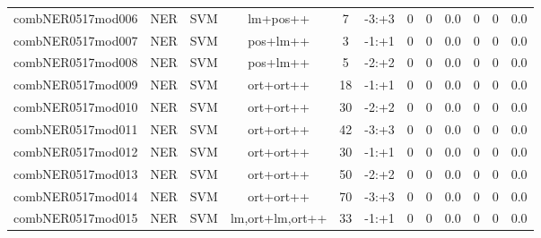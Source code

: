 \documentclass[a4paper]{article}
\begin{document}
\begin{landscape}
\begin{center}
\begin{tabular}{ |c|c|c|c|c|c|c|c|c|c|c|c|}
 
 	
 	\small{ combNER0517mod006 } & \small{ NER} & \small{  SVM }  & lm+pos++  &  7 &  \small{  -3:+3 }  &  0 & 0 & 0.0  &  0 & 0 & 0.0 \\
 	

 
 	
 	\small{ combNER0517mod007 } & \small{ NER} & \small{  SVM }  & pos+lm++  &  3 &  \small{  -1:+1 }  &  0 & 0 & 0.0  &  0 & 0 & 0.0 \\
 	

 
 	
 	\small{ combNER0517mod008 } & \small{ NER} & \small{  SVM }  & pos+lm++  &  5 &  \small{  -2:+2 }  &  0 & 0 & 0.0  &  0 & 0 & 0.0 \\
 	

 
 	
 	\small{ combNER0517mod009 } & \small{ NER} & \small{  SVM }  & ort+ort++  &  18 &  \small{  -1:+1 }  &  0 & 0 & 0.0  &  0 & 0 & 0.0 \\
 	

 
 	
 	\small{ combNER0517mod010 } & \small{ NER} & \small{  SVM }  & ort+ort++  &  30 &  \small{  -2:+2 }  &  0 & 0 & 0.0  &  0 & 0 & 0.0 \\
 	

 
 	
 	\small{ combNER0517mod011 } & \small{ NER} & \small{  SVM }  & ort+ort++  &  42 &  \small{  -3:+3 }  &  0 & 0 & 0.0  &  0 & 0 & 0.0 \\
 	

 
 	
 	\small{ combNER0517mod012 } & \small{ NER} & \small{  SVM }  & ort+ort++  &  30 &  \small{  -1:+1 }  &  0 & 0 & 0.0  &  0 & 0 & 0.0 \\
 	

 
 	
 	\small{ combNER0517mod013 } & \small{ NER} & \small{  SVM }  & ort+ort++  &  50 &  \small{  -2:+2 }  &  0 & 0 & 0.0  &  0 & 0 & 0.0 \\
 	

 
 	
 	\small{ combNER0517mod014 } & \small{ NER} & \small{  SVM }  & ort+ort++  &  70 &  \small{  -3:+3 }  &  0 & 0 & 0.0  &  0 & 0 & 0.0 \\
 	

 
 	
 	\small{ combNER0517mod015 } & \small{ NER} & \small{  SVM }  & lm,ort+lm,ort++  &  33 &  \small{  -1:+1 }  &  0 & 0 & 0.0  &  0 & 0 & 0.0 \\
 	


\end{tabular}
\end{center}
\end{landscape}
\end{document}
